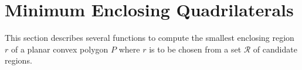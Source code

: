 
\clearpage
\section{Minimum Enclosing Quadrilaterals}
\label{secOOPS}
\cgalColumnLayout

This section describes several functions to compute the smallest
enclosing region $r$ of a planar convex polygon $P$ where $r$ is to be
chosen from a set $\mathcal{R}$ of candidate regions.

